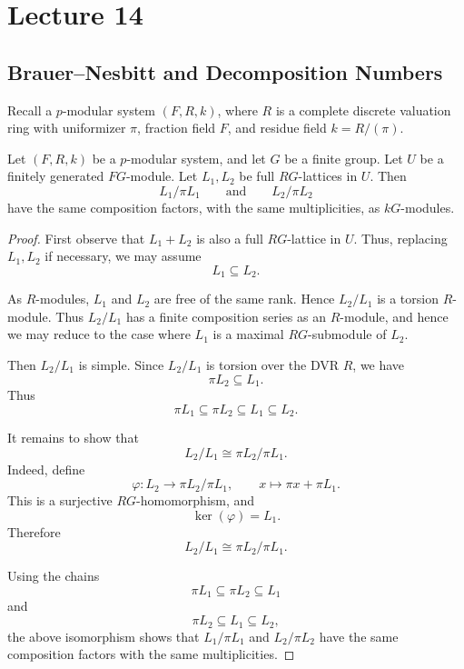 \chapter{Lecture 14}

\section{Brauer--Nesbitt and Decomposition Numbers}

Recall a \(p\)-modular system \((F,R,k)\), where \(R\) is a complete discrete valuation ring
with uniformizer \(\pi\), fraction field \(F\), and residue field \(k=R/(\pi)\).

\begin{theorem}
Let \((F,R,k)\) be a \(p\)-modular system, and let \(G\) be a finite group.
Let \(U\) be a finitely generated \(FG\)-module.
Let \(L_1,L_2\) be full \(RG\)-lattices in \(U\).
Then
\[
L_1/\pi L_1
\qquad\text{and}\qquad
L_2/\pi L_2
\]
have the same composition factors, with the same multiplicities, as \(kG\)-modules.
\end{theorem}

\begin{proof}
First observe that \(L_1+L_2\) is also a full \(RG\)-lattice in \(U\).
Thus, replacing \(L_1,L_2\) if necessary, we may assume
\[
L_1\subseteq L_2.
\]

As \(R\)-modules, \(L_1\) and \(L_2\) are free of the same rank. Hence \(L_2/L_1\)
is a torsion \(R\)-module. Thus \(L_2/L_1\) has a finite composition series as an
\(R\)-module, and hence we may reduce to the case where \(L_1\) is a maximal
\(RG\)-submodule of \(L_2\).

Then \(L_2/L_1\) is simple. Since \(L_2/L_1\) is torsion over the DVR \(R\), we have
\[
\pi L_2\subseteq L_1.
\]
Thus
\[
\pi L_1\subseteq \pi L_2\subseteq L_1\subseteq L_2.
\]

It remains to show that
\[
L_2/L_1 \cong \pi L_2/\pi L_1.
\]
Indeed, define
\[
\varphi:L_2\longrightarrow \pi L_2/\pi L_1,
\qquad
x\longmapsto \pi x+\pi L_1.
\]
This is a surjective \(RG\)-homomorphism, and
\[
\ker(\varphi)=L_1.
\]
Therefore
\[
L_2/L_1\cong \pi L_2/\pi L_1.
\]

Using the chains
\[
\pi L_1\subseteq \pi L_2\subseteq L_1
\]
and
\[
\pi L_2\subseteq L_1\subseteq L_2,
\]
the above isomorphism shows that \(L_1/\pi L_1\) and \(L_2/\pi L_2\) have the same
composition factors with the same multiplicities.
\end{proof}

